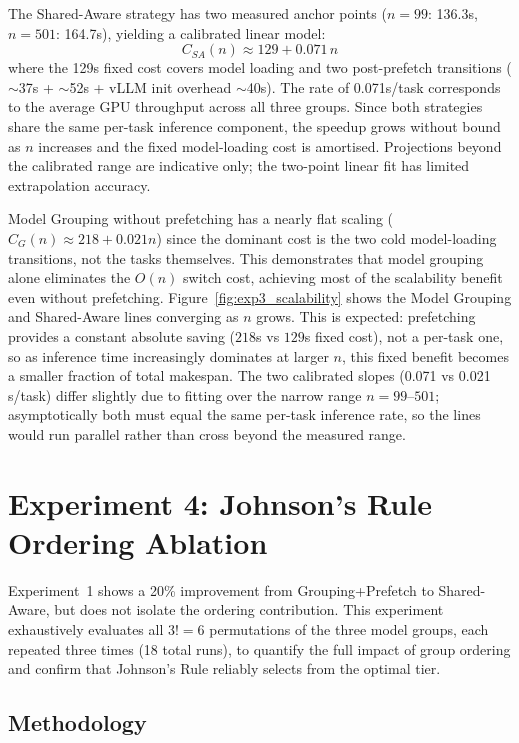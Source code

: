 \documentclass[logo,bsc,singlespacing,parskip,online]{infthesis}
\begin{document}
The Shared-Aware strategy has two measured anchor points ($n=99$: 136.3s, $n=501$: 164.7s), yielding a calibrated linear model:
$$C_{SA}(n) \approx 129 + 0.071\,n$$
where the 129s fixed cost covers model loading and two post-prefetch transitions ($\sim$37s + $\sim$52s + vLLM init overhead $\sim$40s). The rate of 0.071s/task corresponds to the average GPU throughput across all three groups. Since both strategies share the same per-task inference component, the speedup grows without bound as $n$ increases and the fixed model-loading cost is amortised. Projections beyond the calibrated range are indicative only; the two-point linear fit has limited extrapolation accuracy.

Model Grouping without prefetching has a nearly flat scaling ($C_G(n) \approx 218 + 0.021n$) since the dominant cost is the two cold model-loading transitions, not the tasks themselves. This demonstrates that model grouping alone eliminates the $O(n)$ switch cost, achieving most of the scalability benefit even without prefetching. Figure~\ref{fig:exp3_scalability} shows the Model Grouping and Shared-Aware lines converging as $n$ grows. This is expected: prefetching provides a constant absolute saving ($218$s vs $129$s fixed cost), not a per-task one, so as inference time increasingly dominates at larger $n$, this fixed benefit becomes a smaller fraction of total makespan. The two calibrated slopes (0.071 vs 0.021\,s/task) differ slightly due to fitting over the narrow range $n=99$--$501$; asymptotically both must equal the same per-task inference rate, so the lines would run parallel rather than cross beyond the measured range.


\section{Experiment 4: Johnson's Rule Ordering Ablation}

Experiment~1 shows a 20\% improvement from Grouping+Prefetch to Shared-Aware, but does not isolate the ordering contribution. This experiment exhaustively evaluates all $3!=6$ permutations of the three model groups, each repeated three times (18 total runs), to quantify the full impact of group ordering and confirm that Johnson's Rule reliably selects from the optimal tier.

\subsection{Methodology}
\end{document}
